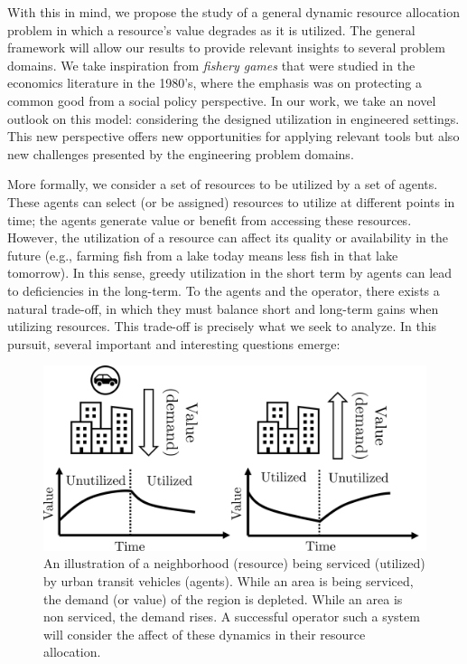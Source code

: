 \documentclass[letterpaper, 10 pt, conference]{ieeeconf}
\begin{document}
With this in mind, we propose the study of a general dynamic resource allocation problem in which a resource's value degrades as it is utilized.
The general framework will allow our results to provide relevant insights to several problem domains.
We take inspiration from \emph{fishery games} that were studied in the economics literature in the 1980's, where the emphasis  was on protecting a common good from a social policy perspective. In our work, we take an novel outlook on this model: considering the designed utilization in engineered settings.
This new perspective offers new opportunities for applying relevant tools but also new challenges presented by the engineering problem domains.

More formally, we consider a set of resources to be utilized by a set of agents. These agents can select (or be assigned) resources to utilize at different points in time; the agents generate value or benefit from accessing these resources. However, the utilization of a resource can affect its quality or availability in the future (e.g., farming fish from a lake today means less fish in that lake tomorrow). In this sense, greedy utilization in the short term by agents can lead to deficiencies in the long-term. To the agents and the operator, there exists a natural trade-off, in which they must balance short and long-term gains when utilizing resources.
This trade-off is precisely what we seek to analyze.
In this pursuit, several important and interesting questions emerge:


\begin{figure}
    \centering
    \includegraphics[width=\columnwidth]{fig_city_2.png}
    \caption{An illustration of a neighborhood (resource) being serviced (utilized) by urban transit vehicles (agents). While an area is being serviced, the demand (or value) of the region is depleted. While an area is non serviced, the demand rises. A successful operator such a system will consider the affect of these dynamics in their resource allocation.}
    \label{fig:app}
    \vspace{-5mm}
\end{figure}
\end{document}
